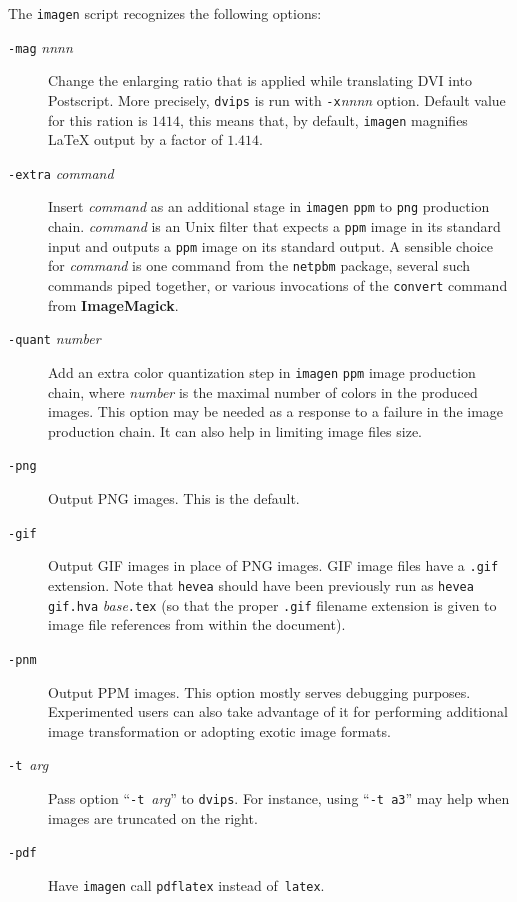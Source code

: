 The \texttt{imagen} script recognizes the following options:
\begin{description}
\item[{\tt -mag} {\sl nnnn}] Change the enlarging ratio that is applied
while translating DVI into Postscript.
More precisely,  \texttt{dvips} is run with \texttt{-x}{\sl nnnn}
option.
Default value for this ration is $1414$, this means
that, by default, \texttt{imagen} magnifies \LaTeX{} output by a factor of
$1.414$.
\item[{\tt -extra} {\it command}] Insert {\it command} as an additional
stage in \texttt{imagen} \texttt{ppm} to \texttt{png} production chain.
\textit{command} is an Unix filter that expects a \texttt{ppm} image
in its standard input and outputs a \texttt{ppm} image on its standard output.
A sensible choice for \textit{command} is one command from the
\texttt{netpbm} package, several such commands piped together, or
various invocations of the \texttt{convert} command from \textbf{ImageMagick}.
\item[{\tt -quant} {\it number}] Add an extra color quantization step
in \texttt{imagen} \texttt{ppm} image production chain, where
\textit{number} is the maximal number of colors in the produced
images. This option may be needed as a response to a failure in the
image production chain. It can also help in limiting image files size.
\item[{\tt -png}] Output PNG images. This is the default.
\item[{\tt -gif}]
Output GIF images in place of PNG images.
GIF image files have a \texttt{.gif} extension.
Note that \texttt{hevea} should have been previously run as
\texttt{hevea gif.hva} \textit{base}\texttt{.tex} (so that the proper
\texttt{.gif} filename
extension is given to image file references from within the \html{}
document).
\item[{\tt -pnm}] Output PPM images. This option mostly serves
debugging purposes. Experimented users can also take advantage
of it for performing additional image transformation or
adopting exotic image formats.
\item[{\tt -t}~{\it arg}] Pass option ``{\tt -t}~{\it arg}'' to
\texttt{dvips}.
For instance, using ``\texttt{-t a3}'' may help when images are
truncated on the right.
\item[{\tt -pdf}]
Have \texttt{imagen} call \texttt{pdflatex} instead
of~\texttt{latex}.
\end{description}

